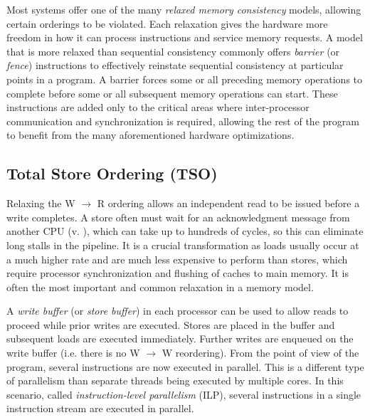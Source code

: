 Most systems offer one of the many \textit{relaxed memory consistency} models,
allowing certain orderings to be violated.  Each relaxation gives the hardware
more freedom in how it can process instructions and service memory requests.  A
model that is more relaxed than sequential consistency commonly offers
\textit{barrier} (or \textit{fence}) instructions to effectively reinstate
sequential consistency at particular points in a program.  A barrier forces some
or all preceding memory operations to complete before some or all subsequent
memory operations can start.  These instructions are added only to the critical
areas where inter-processor communication and synchronization is required,
allowing the rest of the program to benefit from the many aforementioned
hardware optimizations.

\subsection{Total Store Ordering (TSO)}

Relaxing the W $\to$ R ordering allows an independent read to be issued before a
write completes.  A store often must wait for an acknowledgment message from
another CPU (v. ), which can take up to hundreds
of cycles, so this can eliminate long stalls in the pipeline.  It is a crucial
transformation as loads usually occur at a much higher rate and are much less
expensive to perform than stores, which require processor synchronization and
flushing of caches to main memory.  It is often the most important and common
relaxation in a memory model.

A \textit{write buffer} (or \textit{store buffer}) in each processor can be used
to allow reads to proceed while prior writes are executed.  Stores are placed in
the buffer and subsequent loads are executed immediately.  Further writes are
enqueued on the write buffer (i.e. there is no W $\to$ W reordering).  From the
point of view of the program, several instructions are now executed in
parallel\footnotemark.  This is a different type of parallelism than separate
threads being executed by multiple cores.  In this scenario, called
\textit{instruction-level parallelism} (ILP), several instructions in a single
instruction stream are executed in parallel.


